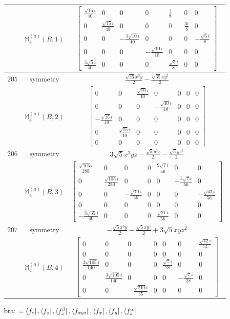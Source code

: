 \documentclass[fleqn,8pt,landscape]{jsarticle}
\begin{document}
\begin{longtable}{ccc}
$  $ & $ \mathbb{M}_{4}^{(a)}(B,1) $ & $ \begin{bmatrix} \frac{\sqrt{15} i}{40} & 0 & 0 & 0 & \frac{i}{8} & 0 & 0 \\ 0 & \frac{\sqrt{15} i}{40} & 0 & 0 & 0 & \frac{3 i}{8} & 0 \\ 0 & 0 & - \frac{3 \sqrt{10} i}{40} & 0 & 0 & 0 & - \frac{\sqrt{6} i}{8} \\ 0 & 0 & 0 & - \frac{\sqrt{10} i}{10} & 0 & 0 & 0 \\ \frac{3 \sqrt{5} i}{40} & 0 & 0 & 0 & \frac{\sqrt{3} i}{8} & 0 & 0 \end{bmatrix} $ \\ \hline
$ 205 $ & $ \text{symmetry} $ & $ \frac{\sqrt{35} x^{3} y}{2} - \frac{\sqrt{35} x y^{3}}{2} $ \\
$  $ & $ \mathbb{M}_{4}^{(a)}(B,2) $ & $ \begin{bmatrix} 0 & 0 & \frac{\sqrt{10} i}{10} & 0 & 0 & 0 & 0 \\ 0 & 0 & 0 & - \frac{\sqrt{10} i}{10} & 0 & 0 & 0 \\ - \frac{\sqrt{15} i}{10} & 0 & 0 & 0 & 0 & 0 & 0 \\ 0 & \frac{\sqrt{15} i}{10} & 0 & 0 & 0 & 0 & 0 \\ 0 & 0 & 0 & 0 & 0 & 0 & 0 \end{bmatrix} $ \\ \hline
$ 206 $ & $ \text{symmetry} $ & $ 3 \sqrt{5} x^{2} y z - \frac{\sqrt{5} y^{3} z}{2} - \frac{\sqrt{5} y z^{3}}{2} $ \\
$  $ & $ \mathbb{M}_{4}^{(a)}(B,3) $ & $ \begin{bmatrix} \frac{\sqrt{105} i}{280} & 0 & 0 & 0 & \frac{9 \sqrt{7} i}{56} & 0 & 0 \\ 0 & \frac{\sqrt{105} i}{280} & 0 & 0 & 0 & - \frac{5 \sqrt{7} i}{56} & 0 \\ 0 & 0 & - \frac{\sqrt{70} i}{40} & 0 & 0 & 0 & - \frac{\sqrt{42} i}{56} \\ 0 & 0 & 0 & 0 & 0 & 0 & 0 \\ - \frac{3 \sqrt{35} i}{40} & 0 & 0 & 0 & \frac{\sqrt{21} i}{56} & 0 & 0 \end{bmatrix} $ \\ \hline
$ 207 $ & $ \text{symmetry} $ & $ - \frac{\sqrt{5} x^{3} y}{2} - \frac{\sqrt{5} x y^{3}}{2} + 3 \sqrt{5} x y z^{2} $ \\
$  $ & $ \mathbb{M}_{4}^{(a)}(B,4) $ & $ \begin{bmatrix} 0 & 0 & 0 & 0 & 0 & 0 & \frac{\sqrt{42} i}{14} \\ 0 & 0 & 0 & 0 & 0 & 0 & 0 \\ \frac{3 \sqrt{105} i}{140} & 0 & 0 & 0 & \frac{\sqrt{7} i}{28} & 0 & 0 \\ 0 & \frac{3 \sqrt{105} i}{140} & 0 & 0 & 0 & - \frac{\sqrt{7} i}{28} & 0 \\ 0 & 0 & - \frac{\sqrt{210} i}{35} & 0 & 0 & 0 & 0 \end{bmatrix} $ \\ \hline
\end{longtable}
bra: $=\bra{f_{c}}, \bra{f_{s}}, \bra{f_{z}^{\beta}}, \bra{f_{xyz}}, \bra{f_{x}}, \bra{f_{y}}, \bra{f_{z}^{\alpha}}$
\end{document}

